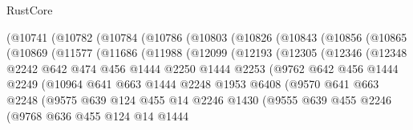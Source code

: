 \begin{lexlean}{RustCore}
\begin{coremodule}
{\begin{coremodule}
{{{{{{{{{{{{{{{{{{{{{{{{{{{{{{{{{{{{{{{{{{{{{    (@10741
      (@10782
        (@10784
          (@10786
            (@10803
              (@10826
                (@10843
                  (@10856
                    (@10865
                      (@10869
                        (@11577
                          (@11686
                            (@11988
                              (@12099
                                (@12193
                                  (@12305
                                    (@12346
                                      (@12348
                                        @2242
                                        @642
                                        @474
                                        @456
                                        @1444
                                        @2250
                                        @1444
                                        @2253
                                        (@9762
                                          @642
                                          @456
                                          @1444
                                          @2249
                                          (@10964
                                            @641
                                            @663
                                            @1444
                                            @2248
                                            @1953
                                            @6408
                                            (@9570
                                              @641
                                              @663
                                              @2248
                                              (@9575
                                                @639
                                                @124
                                                @455
                                                @14
                                                @2246
                                                @1430
                                                (@9555
                                                  @639
                                                  @455
                                                  @2246
                                                  (@9768
                                                    @636
                                                    @455
                                                    @124
                                                    @14
                                                    @1444
}}}}}}}}}}}}}}}}}}}}}}}}}}}}}}}}}}}}}}}}}}}}}
\end{coremodule}}
\end{coremodule}
\end{lexlean}

